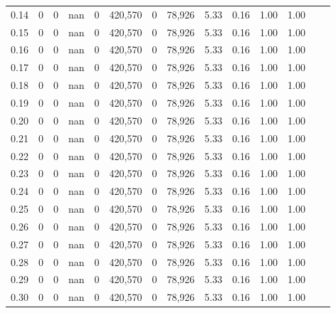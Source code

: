 \begin{tabular}{rrrrrrrrrrrrrr}
0.14 &        0 &       0 &     nan &        0 &  420,570 &       0 &  78,926 &  5.33 &  0.16 &  1.00 &      1.00 \\
0.15 &        0 &       0 &     nan &        0 &  420,570 &       0 &  78,926 &  5.33 &  0.16 &  1.00 &      1.00 \\
0.16 &        0 &       0 &     nan &        0 &  420,570 &       0 &  78,926 &  5.33 &  0.16 &  1.00 &      1.00 \\
0.17 &        0 &       0 &     nan &        0 &  420,570 &       0 &  78,926 &  5.33 &  0.16 &  1.00 &      1.00 \\
0.18 &        0 &       0 &     nan &        0 &  420,570 &       0 &  78,926 &  5.33 &  0.16 &  1.00 &      1.00 \\
0.19 &        0 &       0 &     nan &        0 &  420,570 &       0 &  78,926 &  5.33 &  0.16 &  1.00 &      1.00 \\
0.20 &        0 &       0 &     nan &        0 &  420,570 &       0 &  78,926 &  5.33 &  0.16 &  1.00 &      1.00 \\
0.21 &        0 &       0 &     nan &        0 &  420,570 &       0 &  78,926 &  5.33 &  0.16 &  1.00 &      1.00 \\
0.22 &        0 &       0 &     nan &        0 &  420,570 &       0 &  78,926 &  5.33 &  0.16 &  1.00 &      1.00 \\
0.23 &        0 &       0 &     nan &        0 &  420,570 &       0 &  78,926 &  5.33 &  0.16 &  1.00 &      1.00 \\
0.24 &        0 &       0 &     nan &        0 &  420,570 &       0 &  78,926 &  5.33 &  0.16 &  1.00 &      1.00 \\
0.25 &        0 &       0 &     nan &        0 &  420,570 &       0 &  78,926 &  5.33 &  0.16 &  1.00 &      1.00 \\
0.26 &        0 &       0 &     nan &        0 &  420,570 &       0 &  78,926 &  5.33 &  0.16 &  1.00 &      1.00 \\
0.27 &        0 &       0 &     nan &        0 &  420,570 &       0 &  78,926 &  5.33 &  0.16 &  1.00 &      1.00 \\
0.28 &        0 &       0 &     nan &        0 &  420,570 &       0 &  78,926 &  5.33 &  0.16 &  1.00 &      1.00 \\
0.29 &        0 &       0 &     nan &        0 &  420,570 &       0 &  78,926 &  5.33 &  0.16 &  1.00 &      1.00 \\
0.30 &        0 &       0 &     nan &        0 &  420,570 &       0 &  78,926 &  5.33 &  0.16 &  1.00 &      1.00 \\

\end{tabular}
